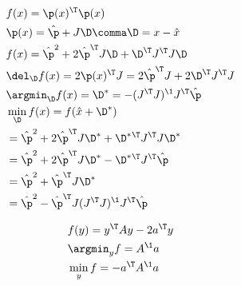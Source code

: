 \begin{align}
& f(x)
  = \p(x)^\T \p(x) \\
& \p(x)
  = \hat \p + J \D \comma \D = x - \hat x\\
& f(x)
  = \hat\p^2 + 2 \hat\p^\T J \D + \D^\T J^\T J \D\\
& \del_\D f(x)
  = 2 \p(x)^\T J
  = 2 \hat\p^\T J + 2 \D^\T J^\T J \\
& \argmin_\D f(x)
  = \D^*
  = - (J^\T J)^\1 J^\T \hat\p \\
& \min_\D f(x)
  = f(\hat x + \D^*) \\
&  = \hat\p^2 + 2 \hat\p^\T J \D^* + \D^*{}^\T J^\T J \D^* \\
&  = \hat\p^2 + 2 \hat\p^\T J \D^* - \D^*{}^\T J^\T \hat\p \\
&  = \hat\p^2 + \hat\p^\T J \D^* \\
&  = \hat\p^2 - \hat\p^\T J (J^\T J)^\1 J^\T \hat\p \\
\end{align}


\begin{align}
&f(y) = y^\T A y -2 a^\T y \\
&\argmin_y f = A^\1 a \\
&\min_y f = -a^\T A^\1 a
\end{align}

